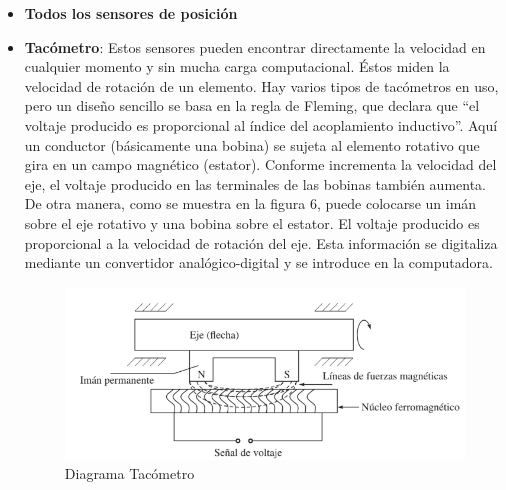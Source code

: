 \documentclass{article}
\begin{document}
	\begin{itemize}
		\item \textbf{Todos los sensores de posición}
		\item \textbf{Tacómetro}: Estos sensores pueden encontrar directamente la velocidad en cualquier momento y sin mucha carga computacional. Éstos miden la velocidad de rotación de un elemento. Hay varios tipos de tacómetros en uso, pero un diseño sencillo se basa en la regla de Fleming, que declara que “el voltaje producido es proporcional al índice del acoplamiento inductivo”. Aquí un conductor (básicamente una bobina) se sujeta al elemento rotativo que gira en un campo magnético (estator). Conforme incrementa la velocidad del eje, el voltaje producido en las terminales de las bobinas también aumenta. De otra manera, como se muestra en la figura 6, puede colocarse un imán sobre el eje rotativo y una bobina sobre el estator. El voltaje producido es proporcional a la velocidad de rotación del eje. Esta información se digitaliza mediante un convertidor analógico-digital y se introduce en la computadora.
		\begin{figure}[H]
			\centering
			\includegraphics[width=\textwidth]{Diagramatacometro.png}
			\caption{Diagrama Tacómetro}
		\end{figure}
		

\end{itemize}
\end{document}
